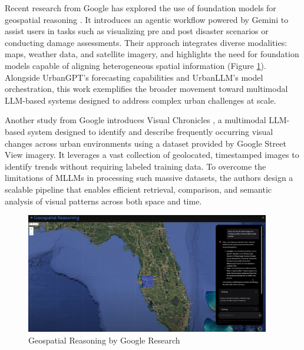 Recent research from Google has explored the use of foundation models for geospatial reasoning \citep{2025GoogleGeospatialReasoning}. It introduces an agentic workflow powered by Gemini to assist users in tasks such as visualizing pre and post disaster scenarios or conducting damage assessments. Their approach integrates diverse modalities: maps, weather data, and satellite imagery, and highlights the need for foundation models capable of aligning heterogeneous spatial information (Figure \ref{fig:geospatial_reasoning}). Alongside UrbanGPT's forecasting capabilities and UrbanLLM's model orchestration, this work exemplifies the broader movement toward multimodal LLM-based systems designed to address complex urban challenges at scale.

Another study from Google introduces Visual Chronicles \citep{Deng2025VisualChronicles}, a multimodal LLM-based system designed to identify and describe frequently occurring visual changes across urban environments using a dataset provided by Google Street View imagery. It leverages a vast collection of geolocated, timestamped images to identify trends without requiring labeled training data. To overcome the limitations of MLLMs in processing such massive datasets, the authors design a scalable pipeline that enables efficient retrieval, comparison, and semantic analysis of visual patterns across both space and time.

\begin{figure}[hbtp]
  \centering
  \includegraphics[width=0.95\textwidth]{images/geospatial_reasoning.png}
  \caption{Geospatial Reasoning by Google Research}
  \label{fig:geospatial_reasoning}
\end{figure}



